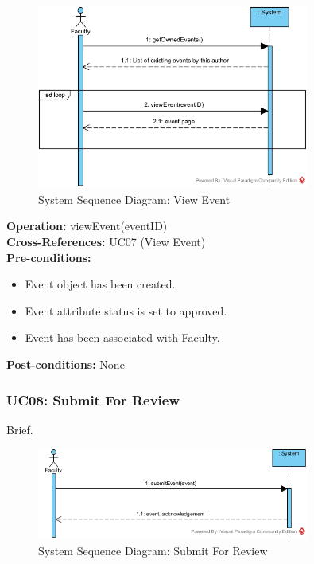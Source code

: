 \documentclass{article}
\begin{document}
\begin{figure}[H]
    \centering
    \includegraphics[width=0.8\textwidth]{images/SSD-UC07-ViewEvent.png}
    \centering
    \caption{System Sequence Diagram: View Event}
\end{figure}

\textbf{Operation:} viewEvent(eventID) \\
\textbf{Cross-References:} UC07 (View Event) \\
\textbf{Pre-conditions:}
\begin{itemize}
    \item Event object has been created.
    \item Event attribute status is set to approved.
    \item Event has been associated with Faculty.
\end{itemize}
\textbf{Post-conditions:} None \\
\subsubsection{UC08: Submit For Review}
Brief.
\begin{figure}[H]
    \centering
    \includegraphics[width=0.8\textwidth]{images/SSD-UC08-SubmitForReview.png}
    \centering
    \caption{System Sequence Diagram: Submit For Review}
\end{figure}
\end{document}
